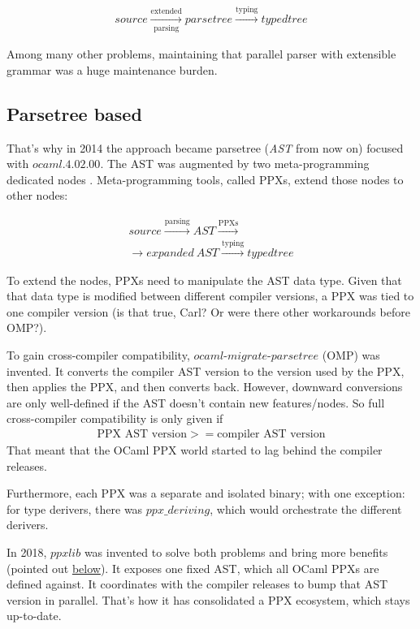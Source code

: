 \documentclass[10pt, a4paper, twocolumn]{article}
\begin{document}
\begin{align*}
source \xrightarrow[\text{parsing}]{\text{extended}} parsetree \xrightarrow{\text{typing}} typedtree
\end{align*}

Among many other problems, maintaining that parallel parser with extensible
grammar was a huge maintenance burden.


\subsection{Parsetree based}

That's why in 2014 the approach became parsetree (\emph{AST} from now on)
focused with $ocaml.4.02.00$. The AST was augmented by two meta-programming
dedicated nodes \cite{extension_nodes}\cite{attributes}. Meta-programming tools,
called PPXs, extend those nodes to other nodes:

\begin{gather*}
source \xrightarrow{\text{parsing}} AST \xrightarrow{\text{PPXs}}\\
\rightarrow expanded\ AST\xrightarrow{\text{typing}} typedtree
\end{gather*}

To extend the nodes, PPXs need to manipulate the AST data type. Given that that
data type is modified between different compiler versions, a PPX was tied to one
compiler version (is that true, Carl? Or were there other workarounds before
OMP?).

To gain cross-compiler compatibility, $ocaml\mbox{-}migrate\mbox{-}parsetree$
(OMP)\cite{omp} was invented. It converts the compiler AST version to the
version used by the PPX, then applies the PPX, and then converts back. However,
downward conversions are only well-defined if the AST doesn't contain new
features/nodes. So full cross-compiler compatibility is only given if
\begin{align*}
\text{PPX\ AST\ version} >= \text{compiler\ AST\ version}
\end{align*}
That meant that the OCaml PPX world started to lag behind the compiler releases.

Furthermore, each PPX was a separate and isolated binary; with one exception:
for type derivers, there was $ppx \_ deriving$, which would orchestrate the
different derivers.

In 2018, $ppxlib$\cite{ppxlib} was invented to solve both problems and bring
more benefits (pointed out \hyperref[benefits]{below}). It exposes one fixed
AST, which all OCaml PPXs are defined against. It coordinates with the compiler
releases to bump that AST version in parallel. That's how it has consolidated a
PPX ecosystem, which stays up-to-date.
\end{document}
